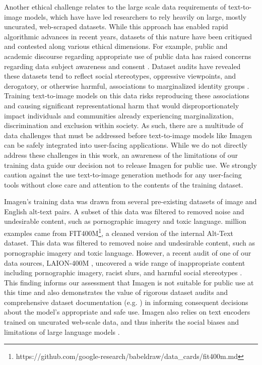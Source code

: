 Another ethical challenge relates to the large scale data requirements of text-to-image models, which have have led researchers to rely heavily on large, mostly uncurated, web-scraped datasets. While this approach has enabled rapid algorithmic advances in recent years, datasets of this nature have been critiqued and contested along various ethical dimensions. For example, public and academic discourse regarding appropriate use of public data has raised concerns regarding data subject awareness and consent \cite{MegaPixels, dulhantychrisIssuesComputerVision2020, Scheuerman2021DoDH, Paullada2021}. Dataset audits have revealed these datasets tend to reflect social stereotypes, oppressive viewpoints, and derogatory, or otherwise harmful, associations to marginalized identity groups \cite{prabhu2020, birhane2021laionaudit}. Training text-to-image models on this data risks reproducing these associations and causing significant representational harm that would disproportionately impact individuals and communities already experiencing marginalization, discrimination and exclusion within society. As such, there are a multitude of data challenges that must be addressed before text-to-image models like Imagen can be safely integrated into user-facing applications. While we do not directly address these challenges in this work, an awareness of the limitations of our training data guide our decision not to release Imagen for public use. We strongly caution against the use text-to-image generation methods for any user-facing tools without close care and attention to the contents of the training dataset. 

Imagen's training data was drawn from several pre-existing datasets of image and English alt-text pairs. 
\ifdefined
A subset of this data was filtered to removed noise and undesirable content, such as pornographic imagery and toxic language. 
 million examples came from FIT400M\footnote{https://github.com/google-research/babeldraw/data_cards/fit400m.md}, a cleaned version of the internal Alt-Text dataset. This data was filtered to removed noise and undesirable content, such as pornographic imagery and toxic language. 
\fi
However, a recent audit of one of our data sources, LAION-400M \cite{schuhmann2021laion}, uncovered a wide range of inappropriate content including pornographic imagery, racist slurs, and harmful social stereotypes \cite{birhane2021laionaudit}. This finding informs our assessment that Imagen is not suitable for public use at this time and also demonstrates the value of rigorous dataset audits and comprehensive dataset documentation (e.g. \cite{gebruDatasheetsDatasets2020, datacards}) in informing consequent decisions about the model's appropriate and safe use. Imagen also relies on text encoders trained on uncurated web-scale data, and thus inherits the social biases and limitations of large language models \cite{bordia-naacl-2017, bender2021, weidinger2021}. 

